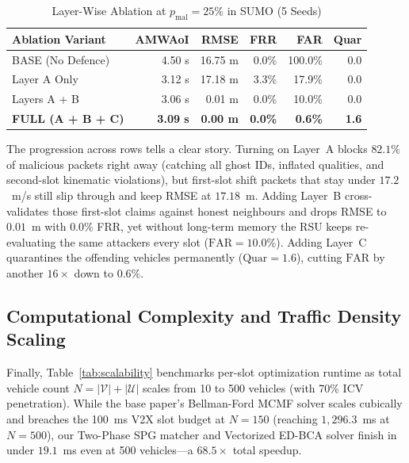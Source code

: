 \documentclass[conference]{IEEEtran}
\begin{document}
\begin{table}[t]
\caption{Layer-Wise Ablation at $p_{\mathrm{mal}}=25\%$ in SUMO (5 Seeds)}
\begin{center}
\footnotesize
\begin{tabular}{lrrrrr}
\toprule
\textbf{Ablation Variant} & \textbf{AMWAoI} & \textbf{RMSE} & \textbf{FRR} & \textbf{FAR} & \textbf{Quar}\\
\midrule
BASE (No Defence) & 4.50 s & 16.75 m & 0.0\% & 100.0\% & 0.0\\
Layer A Only      & 3.12 s & 17.18 m & 3.3\% & 17.9\%  & 0.0\\
Layers A + B      & 3.06 s & 0.01 m  & 0.0\% & 10.0\%  & 0.0\\
\textbf{FULL (A + B + C)} & \textbf{3.09 s} & \textbf{0.00 m} & \textbf{0.0\%} & \textbf{0.6\%} & \textbf{1.6}\\
\bottomrule
\end{tabular}
\label{tab:ablation}
\end{center}
\end{table}

The progression across rows tells a clear story. Turning on Layer~A blocks $82.1\%$ of malicious packets right away (catching all ghost IDs, inflated qualities, and second-slot kinematic violations), but first-slot shift packets that stay under $17.2$~m/s still slip through and keep RMSE at $17.18$~m. Adding Layer~B cross-validates those first-slot claims against honest neighbours and drops RMSE to $0.01$~m with $0.0\%$ FRR, yet without long-term memory the RSU keeps re-evaluating the same attackers every slot ($\mathrm{FAR}=10.0\%$). Adding Layer~C quarantines the offending vehicles permanently ($\mathrm{Quar}=1.6$), cutting $\mathrm{FAR}$ by another $16\times$ down to $0.6\%$.

\subsection{Computational Complexity and Traffic Density Scaling}
Finally, Table~\ref{tab:scalability} benchmarks per-slot optimization runtime as total vehicle count $N=|\mathcal{V}|+|\mathcal{U}|$ scales from 10 to 500 vehicles (with 70\% ICV penetration). While the base paper's Bellman-Ford MCMF solver scales cubically and breaches the 100~ms V2X slot budget at $N=150$ (reaching $1,296.3$~ms at $N=500$), our Two-Phase SPG matcher and Vectorized ED-BCA solver finish in under $19.1$~ms even at 500 vehicles---a $68.5\times$ total speedup.
\end{document}
